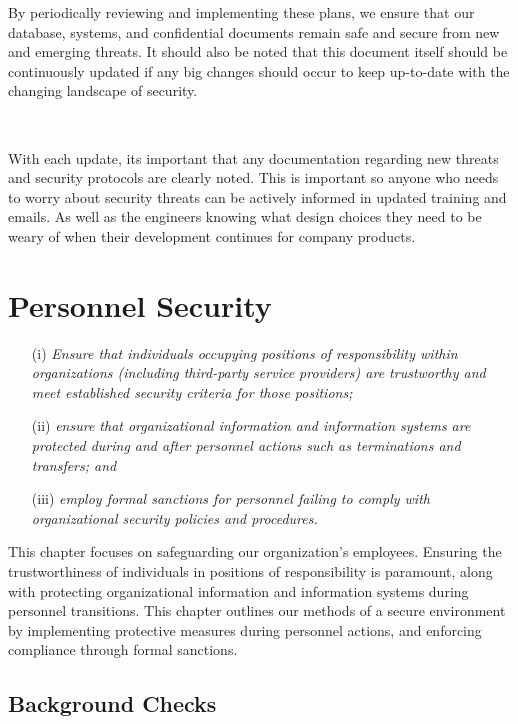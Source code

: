 \documentclass[12pt,a4paper]{report}
\begin{document}
By periodically reviewing and implementing these plans, we ensure that our database, systems, and confidential documents remain safe and secure from new and emerging threats.
It should also be noted that this document itself should be continuously updated if any big changes should occur to keep up-to-date with the changing landscape of security.

\

With each update, its important that any documentation regarding new threats and security protocols are clearly noted.
This is important so anyone who needs to worry about security threats can be actively informed in updated training and emails.
As well as the engineers knowing what design choices they need to be weary of when their development continues for company products.

\chapter{Personnel Security}
\begin{enumerate}
 \item[(i)] \textit{Ensure that individuals occupying positions of responsibility within organizations (including third-party service providers) are trustworthy and meet established security criteria for those positions;}
 \item[(ii)] \textit{ensure that organizational information and information systems are protected during and after personnel actions such as terminations and transfers; and}
 \item[(iii)] \textit{employ formal sanctions for personnel failing to comply with organizational security policies and procedures.}
\end{enumerate}

This chapter focuses on safeguarding our organization's employees.
Ensuring the trustworthiness of individuals in positions of responsibility is paramount, along with protecting organizational information and information systems during personnel transitions. 
This chapter outlines our methods of a secure environment by implementing protective measures during personnel actions, and enforcing compliance through formal sanctions. 

\section{Background Checks}
\
\end{document}
